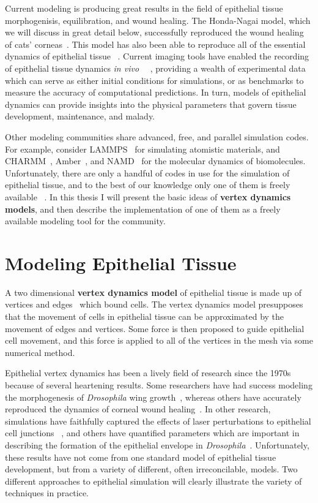 Current modeling is producing great results in the field of epithelial tissue morphogenisis, equilibration, and wound healing. The Honda-Nagai model, which we will discuss in great detail below, successfully reproduced the wound healing of cats' corneas~\cite{WoundHealing}. This model has also been able to reproduce all of the essential dynamics of epithelial tissue ~\cite{HondaNagai}.  Current imaging tools have enabled the recording of epithelial tissue dynamics \emph{in vivo} ~\cite{Solokow}~\cite{Xiong}, providing a wealth of experimental data which can serve as either initial conditions for simulations, or as benchmarks to measure the accuracy of computational predictions. In turn, models of epithelial dynamics can provide insights into the physical parameters that govern tissue development, maintenance, and malady.

Other modeling communities share advanced, free, and parallel simulation codes. For example, consider LAMMPS~\cite{LAMMPS} for simulating atomistic materials, and CHARMM~\cite{CHARMM}, Amber~\cite{Amber}, and NAMD~\cite{NAMD} for the molecular dynamics of biomolecules. Unfortunately, there are only a handful of codes in use for the simulation of epithelial tissue, and to the best of our knowledge only one of them is freely available ~\cite{ChasteMain}. In this thesis I will present the basic ideas of \textbf{vertex dynamics models}, and then describe the implementation of one of them as a freely available modeling tool for the community.

\section{Modeling Epithelial Tissue} 
\label{sec:modeling}

A two dimensional \textbf{vertex dynamics model} of epithelial tissue is made up of vertices and edges~\cite{DirichletDomains} which bound cells. The vertex dynamics model presupposes that the movement of cells in epithelial tissue can be approximated by the movement of edges and vertices. Some force is then proposed to guide epithelial cell movement, and this force is applied to all of the vertices in the mesh via some numerical method.

Epithelial vertex dynamics has been a lively field of research since the 1970s because of several heartening results. Some researchers have had success modeling the morphogenesis of \emph{Drosophila} wing growth~\cite{Farhadifar}, whereas others have accurately reproduced the dynamics of corneal wound healing~\cite{WoundHealing}. In other research, simulations have faithfully captured the effects of laser perturbations to epithelial cell junctions ~\cite{Yoshi}, and others have quantified parameters which are important in describing the formation of the epithelial envelope in \emph{Drosophila}~\cite{Sokolow}. Unfortunately, these results have not come from one standard model of epithelial tissue development, but from a variety of different, often irreconcilable, models. Two different approaches to epithelial simulation will clearly illustrate the variety of techniques in practice.

